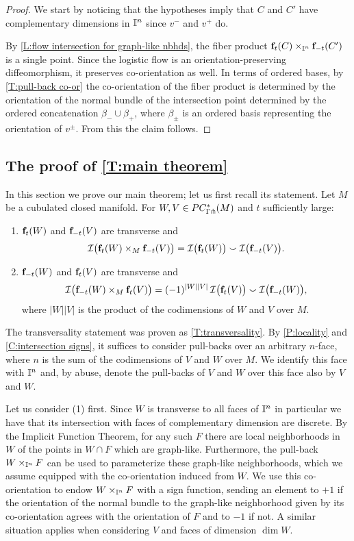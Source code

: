 \begin{proof}
	We start by noticing that the hypotheses imply that $C$ and $C'$ have complementary dimensions in $\mathbb{I}^n$ since $v^-$ and $v^+$ do.

	By \cref{L:flow intersection for graph-like nbhds}, the fiber product $\mathbf{f}_t(C) \times_{\mathbb{I}^n} \mathbf{f}_{-t}(C^\prime)$ is a single point.
	Since the logistic flow is an orientation-preserving diffeomorphism, it preserves co-orientation as well.
	In terms of ordered bases, by \cref{T:pull-back co-or} the co-orientation of the fiber product is determined by the orientation of the normal bundle of the intersection point determined by the ordered concatenation $\beta_- \cup \beta_+$, where $\beta_\pm$ is an ordered basis representing the orientation of $v^\pm$.
	From this the claim follows.
\end{proof}

\subsection{The proof of \cref{T:main theorem}}

In this section we prove our main theorem; let us first recall its statement.
Let $M$ be a cubulated closed manifold.
For $W, V \in PC_{\Gamma\pitchfork}^*(M)$ and $t$ sufficiently large:
\begin{enumerate}
	\item $\mathbf{f}_t(W)$ and $\mathbf{f}_{-t}(V)$ are transverse and
	\[
	\mathcal{I} \big( \mathbf{f}_t(W) \times_M \mathbf{f}_{-t}(V) \big) =
	\mathcal{I} \big( \mathbf{f}_t(W) \big) \smallsmile \mathcal{I} \big( \mathbf{f}_{-t}(V) \big).
	\]
	\item $\mathbf{f}_{-t}(W)$ and $\mathbf{f}_t(V)$ are transverse and
	\[
	\mathcal{I} \big( \mathbf{f}_{-t}(W) \times_M \mathbf{f}_t(V) \big) =
	(-1)^{|W||V|} \, \mathcal{I} \big( \mathbf{f}_t(V) \big) \smallsmile \mathcal{I} \big( \mathbf{f}_{-t}(W) \big),
	\]
	where $|W||V|$ is the product of the codimensions of $W$ and $V$ over $M$.
\end{enumerate}

The transversality statement was proven as \cref{T:transversality}.
By \cref{P:locality} and \cref{C:intersection signs}, it suffices to consider pull-backs over an arbitrary $n$-face, where $n$ is the sum of the codimensions of $V$ and $W$ over $M$.
We identify this face with $\mathbb{I}^n$ and, by abuse, denote the pull-backs of $V$ and $W$ over this face also by $V$ and $W$.

Let us consider (1) first.
Since $W$ is transverse to all faces of $\mathbb{I}^n$ in particular we have that its intersection with faces of complementary dimension are discrete.
By the Implicit Function Theorem, for any such $F$ there are local neighborhoods in $W$ of the points in $W \cap F$ which are graph-like.
Furthermore, the pull-back $W \times_{\mathbb{I}^n} F$ can be used to parameterize these graph-like neighborhoods, which we assume equipped with the co-orientation induced from $W$.
We use this co-orientation to endow $W \times_{\mathbb{I}^n} F$ with a sign function,
sending an element to $+1$ if the orientation of the normal bundle to the graph-like neighborhood given by its co-orientation agrees
with the orientation of $F$ and to $-1$ if not.
A similar situation applies when considering $V$ and faces of dimension $\dim W$.

